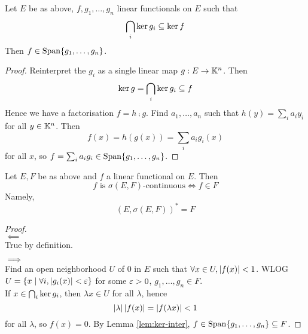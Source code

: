 \documentclass{article}
\begin{document}
\begin{lem}\label{lem:ker-inter}
  Let $E$ be as above, $f, g_1, \dots, g_n$ linear functionals on $E$ such that
  $$\bigcap_i \ker g_i \subseteq \ker f$$
  Then $f \in \operatorname{Span} \{g_1, \dots, g_n\}$.
\end{lem}
\begin{proof}
  Reinterpret the $g_i$ as a single linear map $g : E \to \mathbb K^n$. Then
  $$\ker g = \bigcap_i \ker g_i \subseteq f$$
  Hence we have a factorisation $f = h \comp g$. Find $a_1, \dots, a_n$ such that $h(y) = \sum_i a_i y_i$ for all $y \in \mathbb K^n$. Then
  $$f(x) = h(g(x)) = \sum_i a_ig_i(x)$$
  for all $x$, so $f = \sum_i a_i g_i \in \operatorname{Span} \{g_1, \dots, g_n\}$.
\end{proof}

\begin{prop}
  Let $E, F$ be as above and $f$ a linear functional on $E$. Then
  $$f \text{ is } \sigma(E, F)\text{-continuous} \iff f \in F$$
  Namely,
  $$(E, \sigma(E, F))^* = F$$
\end{prop}
\begin{proof}~\\
  $\impliedby$ \\
  True by definition.
  
  $\implies$ \\
  Find an open neighborhood $U$ of $0$ in $E$ such that $\forall x \in U, \left\lvert f(x)\right\rvert < 1$. WLOG $U = \{x \mid \forall i, \left\lvert g_i(x)\right\rvert < \varepsilon\}$ for some $\varepsilon > 0$, $g_1, \dots, g_n \in F$. \\
  If $x \in \bigcap_i \ker g_i$, then $\lambda x \in U$ for all $\lambda$, hence
  $$\left\lvert \lambda\right\rvert\left\lvert f(x)\right\rvert = \left\lvert f(\lambda x)\right\rvert < 1$$
  for all $\lambda$, so $f(x) = 0$. By Lemma \ref{lem:ker-inter}, $f \in \operatorname{Span} \{g_1, \dots, g_n\} \subseteq F$.
\end{proof}
\end{document}
